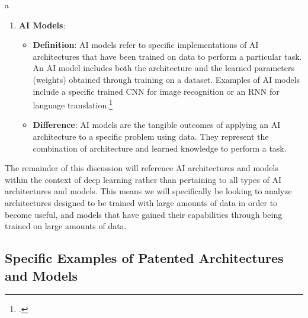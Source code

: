a\documentclass{article}[10pt]
\begin{document}
\begin{enumerate}
	\begin{itemize}
		\item \textbf{Definition}: 
        AI architectures refer to the underlying structure and design of an AI system. 
        This includes the arrangement of algorithms, data flow, interfaces, and the interaction between different components. 
        Common AI architectures include feedforward neural networks, convolutional neural networks (CNNs), and recurrent neural networks (RNNs).\footnote{
            \cite{goodfellow2016deep}.}
		\item \textbf{Difference}: 
        AI architectures define the blueprint or framework for building AI models. 
        They provide the structure, while AI models are the specific implementations that have been trained on data.
	\end{itemize}
	\item \textbf{AI Models}:
	\begin{itemize}
		\item \textbf{Definition}: 
        AI models refer to specific implementations of AI architectures that have been trained on data to perform a particular task. 
        An AI model includes both the architecture and the learned parameters (weights) obtained through training on a dataset. 
        Examples of AI models include a specific trained CNN for image recognition or an RNN for language translation.\footnote{
            \cite{goodfellow2016deep}.}
		\item \textbf{Difference}: 
        AI models are the tangible outcomes of applying an AI architecture to a specific problem using data. 
        They represent the combination of architecture and learned knowledge to perform a task.
	\end{itemize}
\end{enumerate}

The remainder of this discussion will reference AI architectures and models within the context of deep learning rather than pertaining to all types of AI architectures and models. This means we will specifically be looking to analyze architectures designed to be trained with large amounts of data in order to become useful, and models that have gained their capabilities through being trained on large amounts of data.

\subsection{Specific Examples of Patented Architectures and Models}
\end{document}
